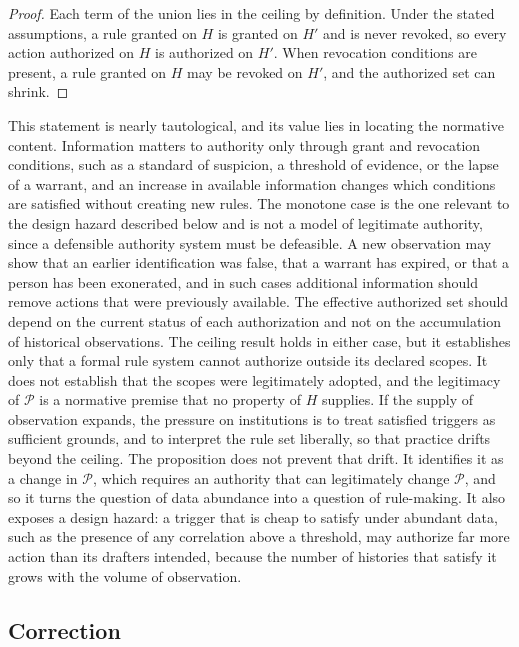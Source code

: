 \documentclass[11pt]{article}
\theoremstyle{plain}
\theoremstyle{definition}
\theoremstyle{remark}
\begin{document}
\begin{proof}
Each term of the union lies in the ceiling by definition. Under the stated assumptions, a rule granted on $H$ is granted on $H'$ and is never revoked, so every action authorized on $H$ is authorized on $H'$. When revocation conditions are present, a rule granted on $H$ may be revoked on $H'$, and the authorized set can shrink.
\end{proof}

This statement is nearly tautological, and its value lies in locating the normative content. Information matters to authority only through grant and revocation conditions, such as a standard of suspicion, a threshold of evidence, or the lapse of a warrant, and an increase in available information changes which conditions are satisfied without creating new rules. The monotone case is the one relevant to the design hazard described below and is not a model of legitimate authority, since a defensible authority system must be defeasible. A new observation may show that an earlier identification was false, that a warrant has expired, or that a person has been exonerated, and in such cases additional information should remove actions that were previously available. The effective authorized set should depend on the current status of each authorization and not on the accumulation of historical observations. The ceiling result holds in either case, but it establishes only that a formal rule system cannot authorize outside its declared scopes. It does not establish that the scopes were legitimately adopted, and the legitimacy of $\mathcal{P}$ is a normative premise that no property of $H$ supplies. If the supply of observation expands, the pressure on institutions is to treat satisfied triggers as sufficient grounds, and to interpret the rule set liberally, so that practice drifts beyond the ceiling. The proposition does not prevent that drift. It identifies it as a change in $\mathcal{P}$, which requires an authority that can legitimately change $\mathcal{P}$, and so it turns the question of data abundance into a question of rule-making. It also exposes a design hazard: a trigger that is cheap to satisfy under abundant data, such as the presence of any correlation above a threshold, may authorize far more action than its drafters intended, because the number of histories that satisfy it grows with the volume of observation.

\subsection{Correction}
\end{document}
